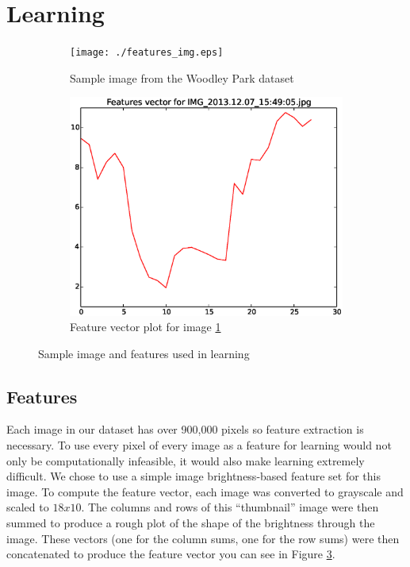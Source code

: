 \documentclass{article}
\begin{document}
\section{Learning}

\begin{figure}[h!]
  \begin{subfigure}[!h]{0.5\textwidth}
    \centering
    \texttt{[image: ./features\_img.eps]}
    \caption{Sample image from the Woodley Park dataset}
    \label{img:woodley_sample}
  \end{subfigure}
  \begin{subfigure}[!h]{0.5\textwidth}
    \centering
    \includegraphics[width=\textwidth]{./Brightness_data.eps}
    \caption{Feature vector plot for image \ref{img:woodley_sample}}
    \label{img:woodley_features}
  \end{subfigure}
  \caption{Sample image and features used in learning}
\end{figure}

\subsection{Features}
Each image in our dataset has over 900,000 pixels so feature extraction is necessary. To use every pixel of every image as a feature for learning would not only be computationally infeasible, it would also make learning extremely difficult. We chose to use a simple image brightness-based feature set for this image. To compute the feature vector, each image was converted to grayscale and scaled to $18x10$. The columns and rows of this ``thumbnail'' image were then summed to produce a rough plot of the shape of the brightness through the image. These vectors (one for the column sums, one for the row sums) were then concatenated to produce the feature vector you can see in Figure \ref{img:woodley_features}.
\end{document}
